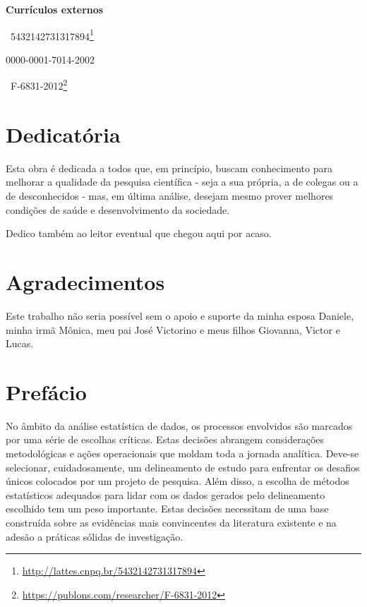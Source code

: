 \documentclass[
  a4paper,
]{book}
\renewcommand{\href}[2]{#2\footnote{\url{#1}}}
\begin{document}
\textbf{Currículos externos}

\href{http://lattes.cnpq.br/5432142731317894}{~5432142731317894}

0000-0001-7014-2002

\href{https://publons.com/researcher/F-6831-2012}{~F-6831-2012}

\hypertarget{dedicatuxf3ria}{%
\chapter*{Dedicatória}\label{dedicatuxf3ria}}

\markboth{}{}

Esta obra é dedicada a todos que, em princípio, buscam conhecimento para melhorar a qualidade da pesquisa científica - seja a sua própria, a de colegas ou a de desconhecidos - mas, em última análise, desejam mesmo prover melhores condições de saúde e desenvolvimento da sociedade.

Dedico também ao leitor eventual que chegou aqui por acaso.

\hypertarget{agradecimentos}{%
\chapter*{Agradecimentos}\label{agradecimentos}}

\markboth{}{}

Este trabalho não seria possível sem o apoio e suporte da minha esposa Daniele, minha irmã Mônica, meu pai José Victorino e meus filhos Giovanna, Victor e Lucas.

\hypertarget{prefuxe1cio}{%
\chapter*{Prefácio}\label{prefuxe1cio}}

\markboth{}{}

No âmbito da análise estatística de dados, os processos envolvidos são marcados por uma série de escolhas críticas. Estas decisões abrangem considerações metodológicas e ações operacionais que moldam toda a jornada analítica. Deve-se selecionar, cuidadosamente, um delineamento de estudo para enfrentar os desafios únicos colocados por um projeto de pesquisa. Além disso, a escolha de métodos estatísticos adequados para lidar com os dados gerados pelo delineamento escolhido tem um peso importante. Estas decisões necessitam de uma base construída sobre as evidências mais convincentes da literatura existente e na adesão a práticas sólidas de investigação.
\end{document}
